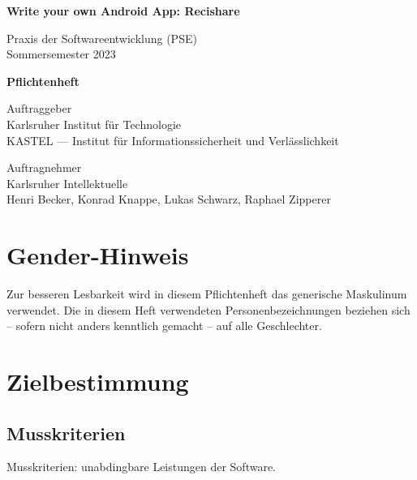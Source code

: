 \documentclass[parskip=full]{scrartcl}
\begin{document}
\begin{titlepage}
    \begin{center}
        \begin{Huge}
            {\textbf{Write your own Android App: Recishare}}
        \end{Huge}
        \vspace{12px}

        Praxis der Softwareentwicklung (PSE)\\
        Sommersemester 2023\\
        \vspace{150px}

        \begin{Huge}
            {\textbf{Pflichtenheft}}
        \end{Huge}
        \vspace{12px}

        Auftraggeber\\
        Karlsruher Institut für Technologie\\
        KASTEL — Institut für Informationssicherheit und Verlässlichkeit\\
        \vspace{330px}

        Auftragnehmer\\
        Karlsruher Intellektuelle\\
        Henri Becker, Konrad Knappe, Lukas Schwarz, Raphael Zipperer\\
    \end{center}
\end{titlepage}

\tableofcontents

\vspace{32px}
\section*{Gender-Hinweis}
Zur besseren Lesbarkeit wird in diesem Pflichtenheft das generische Maskulinum verwendet.
Die in diesem Heft verwendeten Personenbezeichnungen beziehen sich – sofern nicht anders kenntlich gemacht – auf alle Geschlechter.
\newpage


\section{Zielbestimmung}

\subsection{Musskriterien}
Musskriterien: unabdingbare Leistungen der Software.
\end{document}
